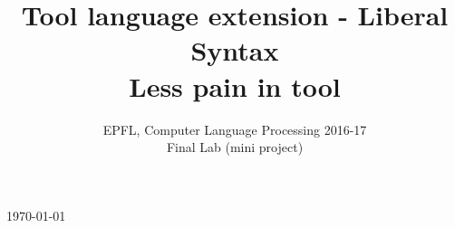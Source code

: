 \documentclass[nocopyrightspace, 11pt, authoryear, preprint]{sigplanconf}
\begin{document}



\title{Tool language extension - Liberal Syntax \\{\small Less pain in tool}}

\subtitle{EPFL, Computer Language Processing 2016-17 \\ Final Lab (mini project)}

\vfill
\today

\maketitle











\def\UrlBreaks{\do\/\do-}


\end{document}
